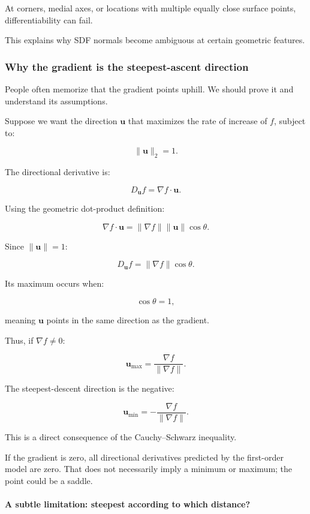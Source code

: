 At corners, medial axes, or locations with multiple equally close surface points, differentiability can fail.

This explains why SDF normals become ambiguous at certain geometric features.

\subsubsection{Why the gradient is the steepest-ascent direction}\label{02-foundations-ii-ch021-why-the-gradient-is-the-steepest-ascent-direction}

People often memorize that the gradient points uphill. We should prove it and understand its assumptions.

Suppose we want the direction \(\mathbf u\) that maximizes the rate of increase of \(f\), subject to:

\[
\|\mathbf u\|_2=1.
\]

The directional derivative is:

\[
D_{\mathbf u}f=\nabla f\cdot\mathbf u.
\]

Using the geometric dot-product definition:

\[
\nabla f\cdot\mathbf u = \|\nabla f\|\|\mathbf u\|\cos\theta.
\]

Since \(\|\mathbf u\|=1\):

\[
D_{\mathbf u}f = \|\nabla f\|\cos\theta.
\]

Its maximum occurs when:

\[
\cos\theta=1,
\]

meaning \(\mathbf u\) points in the same direction as the gradient.

Thus, if \(\nabla f\ne0\):

\[
\boxed{ \mathbf u_{\max}= \frac{\nabla f}{\|\nabla f\|} }.
\]

The steepest-descent direction is the negative:

\[
\boxed{ \mathbf u_{\min}= -\frac{\nabla f}{\|\nabla f\|} }.
\]

This is a direct consequence of the Cauchy--Schwarz inequality.

If the gradient is zero, all directional derivatives predicted by the first-order model are zero. That does not necessarily imply a minimum or maximum; the point could be a saddle.

\paragraph{A subtle limitation: steepest according to which distance?}\label{02-foundations-ii-ch021-a-subtle-limitation-steepest-according-to-which-distance}

